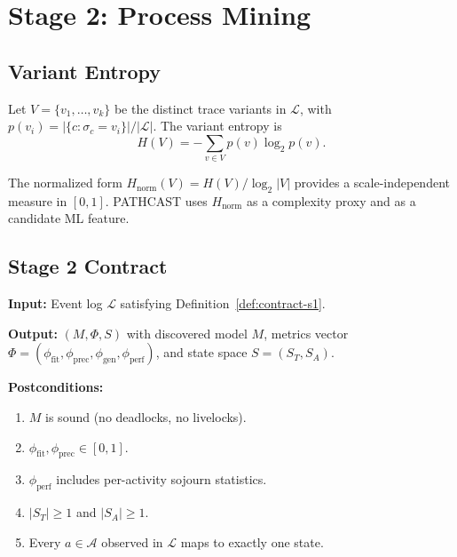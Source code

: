\section{Stage 2: Process Mining}
\label{sec:stage2}

\subsection{Variant Entropy}
\label{sec:variant-entropy}

\begin{definition}
\label{def:variant-entropy}
Let $V = \{v_1, \ldots, v_k\}$ be the distinct trace variants in
$\mathcal{L}$, with $p(v_i) = |\{c : \sigma_c = v_i\}| / |\mathcal{L}|$.
The variant entropy is
\begin{equation}
H(V) = -\sum_{v \in V} p(v) \log_2 p(v).
\label{eq:variant-entropy}
\end{equation}
\end{definition}

The normalized form $H_{\text{norm}}(V) = H(V) / \log_2 |V|$ provides a
scale-independent measure in $[0, 1]$. PATHCAST uses $H_{\text{norm}}$ as
a complexity proxy and as a candidate ML feature.

\subsection{Stage 2 Contract}

\begin{definition}
\label{def:contract-s2}
\textbf{Input:} Event log $\mathcal{L}$ satisfying
Definition~\ref{def:contract-s1}.

\textbf{Output:} $(M, \Phi, S)$ with discovered model $M$, metrics vector
$\Phi = (\phi_{\text{fit}}, \phi_{\text{prec}}, \phi_{\text{gen}},
\phi_{\text{perf}})$, and state space $S = (S_T, S_A)$.

\textbf{Postconditions:}
\begin{enumerate}
    \item $M$ is sound (no deadlocks, no livelocks).
    \item $\phi_{\text{fit}}, \phi_{\text{prec}} \in [0, 1]$.
    \item $\phi_{\text{perf}}$ includes per-activity sojourn statistics.
    \item $|S_T| \geq 1$ and $|S_A| \geq 1$.
    \item Every $a \in \mathcal{A}$ observed in $\mathcal{L}$ maps to
    exactly one state.
\end{enumerate}
\end{definition}


